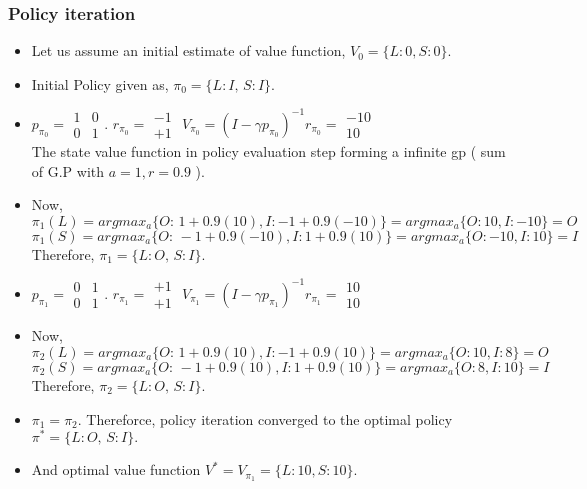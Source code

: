 \documentclass{article}
\begin{document}
\subsubsection{Policy iteration}
\begin{itemize}
\item Let us assume an initial estimate of value function, $V_{0}=\{L:0,S:0\}.$

\item Initial Policy given as, $\pi_{0}=\{L:I,\,S:I\}$.
 
\item $p_{\pi_{0}}=\begin{array}{cc}
1 & 0\\
0 & 1
\end{array}$. $r_{\pi_{0}}=\begin{array}{c}
-1\\
+1
\end{array}$ $V_{\pi_{0}}=(I-\gamma p_{\pi_{0}})^{-1}r_{\pi_{0}}=\begin{array}{c}
-10\\
10
\end{array}$
\\The state value function in policy evaluation step forming a infinite gp ( sum of G.P with $a=1 ,r=0.9$ ).
\item Now, $\pi_{1}(L)=argmax_{a}\{O:\,1+0.9(10),I:-1+0.9(-10)\}=argmax_{a}\{O:10,I:-10\}=O$\\
$\pi_{1}(S)=argmax_{a}\{O:\,-1+0.9(-10),I:1+0.9(10)\}=argmax_{a}\{O:-10,I:10\}=I$\\
Therefore, $\pi_{1}=\{L:O,\,S:I\}$.
\item $p_{\pi_{1}}=\begin{array}{cc}
0 & 1\\
0 & 1
\end{array}$. $r_{\pi_{1}}=\begin{array}{c}
+1\\
+1
\end{array}$ $V_{\pi_{1}}=(I-\gamma p_{\pi_{1}})^{-1}r_{\pi_{1}}=\begin{array}{c}
10\\
10
\end{array}$
\item Now, $\pi_{2}(L)=argmax_{a}\{O:\,1+0.9(10),I:-1+0.9(10)\}=argmax_{a}\{O:10,I:8\}=O$\\
$\pi_{2}(S)=argmax_{a}\{O:\,-1+0.9(10),I:1+0.9(10)\}=argmax_{a}\{O:8,I:10\}=I$\\
Therefore, $\pi_{2}=\{L:O,\,S:I\}$.
\item $\pi_{1}=\pi_{2}.$ Thereforce, policy iteration converged to the
optimal policy $\pi^{*}=\{L:O,\,S:I\}.$
\item And optimal value function $V^{*}=V_{\pi_{1}}=\{L:10,S:10\}.$
\end{itemize}
\end{document}
